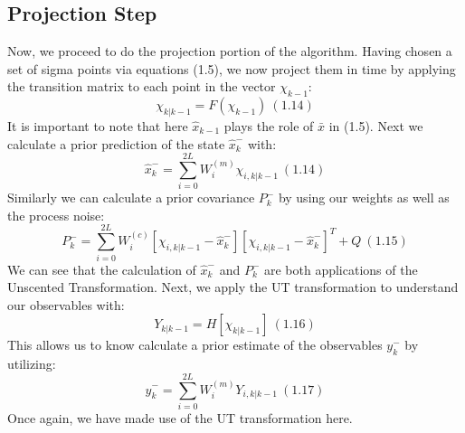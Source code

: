     \subsection{Projection Step}
    Now, we proceed to do the projection portion of the algorithm. Having chosen a set of sigma points via  equations (1.5), we now project them in time by applying the transition matrix to each point in the vector $\chi_{k-1}$:
    $$\chi_{k|k-1} = F(\chi_{k-1}) \ (1.14)$$
    It is important to note that here $\hat{x}_{k-1}$ plays the role of $\bar{x}$ in (1.5).
    Next we calculate a prior prediction of the state $\hat{x}_k^-$ with:
    $$ \hat{x}_k^- = \sum_{i = 0}^{2L} W_i^{(m)} \chi_{i, k|k-1} \ (1.14)$$
    Similarly we can calculate a prior covariance $P_k^-$ by using our weights as well as the process noise:
    $$ P_k^- = \sum_{i = 0}^{2L} W_i^{(c)} [\chi_{i, k|k-1} - \hat{x}_k^-][\chi_{i, k|k-1} - \hat{x}_k^-]^T + Q \ (1.15)$$
    We can see that the calculation of $\hat{x}_k^-$ and $P_k^-$ are both applications of the Unscented Transformation. Next, we apply the UT transformation to understand our observables with:
    $$ Y_{k|k-1} = H[\chi_{k|k-1}] \ (1.16)$$
    This allows us to know calculate a prior estimate of the observables $y_k^-$ by utilizing:
    $$ \hat{y}_k^- = \sum_{i=0}^{2L} W_i^{(m)} Y_{i,k|k-1} \ (1.17) $$
     Once again, we have made use of the UT transformation here.
